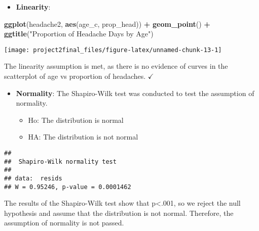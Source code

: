 \documentclass[]{article}
\newenvironment{Shaded}{\begin{snugshade}}{\end{snugshade}}
\newcommand{\KeywordTok}[1]{\textcolor[rgb]{0.13,0.29,0.53}{\textbf{#1}}}
\newcommand{\NormalTok}[1]{#1}
\newcommand{\OperatorTok}[1]{\textcolor[rgb]{0.81,0.36,0.00}{\textbf{#1}}}
\newcommand{\StringTok}[1]{\textcolor[rgb]{0.31,0.60,0.02}{#1}}
\providecommand{\tightlist}{%
  \setlength{\itemsep}{0pt}\setlength{\parskip}{0pt}}
\begin{document}
\begin{itemize}
\tightlist
\item
  \textbf{Linearity}:
\end{itemize}

\begin{Shaded}
\begin{Highlighting}[]
\KeywordTok{ggplot}\NormalTok{(headache2, }\KeywordTok{aes}\NormalTok{(age_c, prop_head)) }\OperatorTok{+}\StringTok{ }\KeywordTok{geom_point}\NormalTok{() }\OperatorTok{+}\StringTok{ }
\StringTok{  }\KeywordTok{ggtitle}\NormalTok{(}\StringTok{"Proportion of Headache Days by Age"}\NormalTok{)}
\end{Highlighting}
\end{Shaded}

\begin{center}\texttt{[image: project2final\_files/figure-latex/unnamed-chunk-13-1]} \end{center}

The linearity assumption is met, as there is no evidence of curves in
the scatterplot of age vs proportion of headaches. \(\checkmark\)

\begin{itemize}
\item
  \textbf{Normality}: The Shapiro-Wilk test was conducted to test the
  assumption of normality.

  \begin{itemize}
  \tightlist
  \item
    Ho: The distribution is normal
  \item
    HA: The distribution is not normal
  \end{itemize}
\end{itemize}

\begin{Shaded}
\end{Shaded}

\begin{verbatim}
## 
##  Shapiro-Wilk normality test
## 
## data:  resids
## W = 0.95246, p-value = 0.0001462
\end{verbatim}

The results of the Shapiro-Wilk test show that p\textless{}.001, so we
reject the null hypothesis and assume that the distribution is not
normal. Therefore, the assumption of normality is not passed.
\end{document}
